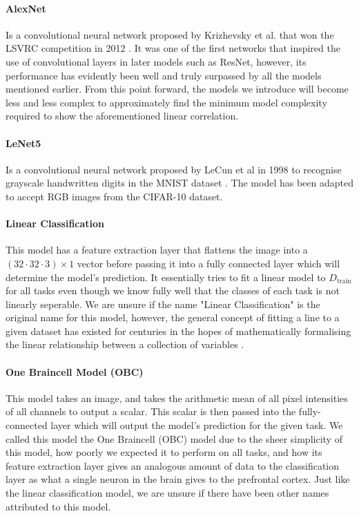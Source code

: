 \documentclass{article}
\begin{document}
\paragraph{AlexNet} Is a convolutional neural network proposed by Krizhevsky et al. that won the LSVRC competition in 2012 \cite{krizhevsky2017imagenet}. It was one of the first networks that inspired the use of convolutional layers in later models such as ResNet, however, its performance has evidently been well and truly surpassed by all the models mentioned earlier. From this point forward, the models we introduce will become less and less complex to approximately find the minimum model complexity required to show the aforementioned linear correlation.

\paragraph{LeNet5} Is a convolutional neural network proposed by LeCun et al in 1998 to recognise grayscale handwritten digits in the MNIST dataset \cite{726791}. The model has been adapted to accept RGB images from the CIFAR-10 dataset.

\paragraph{Linear Classification} This model has a feature extraction layer that flattens the image into a $(32\cdot 32 \cdot 3) \times 1$ vector before passing it into a fully connected layer which will determine the model's prediction. It essentially tries to fit a linear model to $D_\text{train}$ for all tasks even though we know fully well that the classes of each task is not linearly seperable. We are unsure if the name "Linear Classification" is the original name for this model, however, the general concept of fitting a line to a given dataset has existed for centuries in the hopes of mathematically formalising the linear relationship between a collection of variables \cite{Belov2018}.

\paragraph{One Braincell Model (OBC)} This model takes an image, and takes the arithmetic mean of all pixel intensities of all channels to output a scalar. This scalar is then passed into the fully-connected layer which will output the model's prediction for the given task. We called this model the One Braincell (OBC) model due to the sheer simplicity of this model, how poorly we expected it to perform on all tasks, and how its feature extraction layer gives an analogous amount of data to the classification layer as what a single neuron in the brain gives to the prefrontal cortex. Just like the linear classification model, we are unsure if there have been other names attributed to this model.
\end{document}
